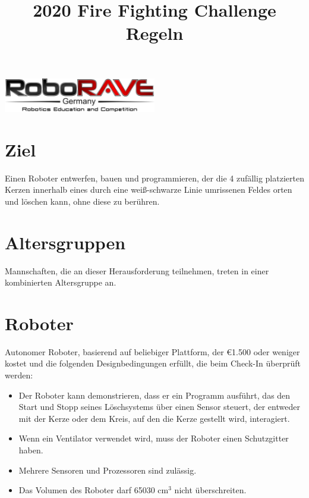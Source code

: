 \documentclass[a4paper,12pt]{article}
\begin{document}
\title{2020 Fire Fighting Challenge Regeln}
\makeatletter
\let\inserttitle\@title
\makeatother
\begin{center}
\includegraphics[width=0.5\textwidth]{logo.png}

\huge                      %
\bfseries                   %
\inserttitle
  \end{center}
\section{Ziel}
Einen Roboter entwerfen, bauen und programmieren, der die 4 zufällig platzierten Kerzen innerhalb eines durch eine weiß-schwarze Linie umrissenen Feldes orten und löschen kann, ohne diese zu berühren.
\section{Altersgruppen}
Mannschaften, die an dieser Herausforderung teilnehmen, treten in einer kombinierten Altersgruppe an.
\section{Roboter}
Autonomer Roboter, basierend auf beliebiger Plattform, der \euro{1.500}  oder weniger kostet und die folgenden Designbedingungen erfüllt, die beim Check-In überprüft werden:
\begin{itemize}
	\item Der Roboter kann demonstrieren, dass er ein Programm ausführt, das den Start und Stopp seines Löschsystems über einen Sensor steuert, der entweder mit der Kerze oder dem Kreis, auf den die Kerze gestellt wird, interagiert.
	\item Wenn ein Ventilator verwendet wird, muss der Roboter einen Schutzgitter haben.
	\item Mehrere Sensoren und Prozessoren sind zulässig.
	\item Das Volumen des Roboter darf 65030 cm$^{3}$ nicht überschreiten.
\end{itemize}
\end{document}
